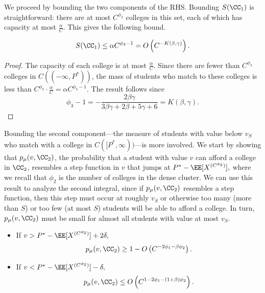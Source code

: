 \documentclass[10pt]{article}
\begin{document}
\begin{ReviewVerbatim}
We proceed by bounding the two components of the RHS. Bounding $S(\CC_1)$ is straightforward: there are at most $C^{\phi_3}$ colleges in this set, each of which has capacity at most $\frac{\alpha}{C}.$ This gives the following bound.
\begin{proposition}\label{prop:duck-1}
\begin{equation}
    S(\CC_1) \le \alpha C^{\phi_3 - 1} = O\left(C^{-K(\beta,\gamma)}\right).
\end{equation}
\end{proposition}
\begin{proof}
    The capacity of each college is at most $\frac{\alpha}{C}$. Since there are fewer than $C^{\phi_3}$ colleges in $C((-\infty, P^*))$, the mass of students who match to these colleges is less than $C^{\phi_3}\cdot \frac{\alpha}{C} = \alpha C^{\phi_3 - 1}.$ The result follows since
    \begin{equation}
        \phi_3 - 1 = -\frac{2\beta\gamma}{3\beta\gamma + 2\beta + 5\gamma + 6} = K(\beta,\gamma).
    \end{equation}
\end{proof}
Bounding the second component---the measure of students with value below $v_S$ who match with a college in $C([P^*,\infty))$---is more involved. We start by showing that $p_\mu(v, \CC_2)$, the probability that a student with value $v$ can afford a college in $\CC_2$, resembles a step function in $v$ that jumps at $P^* - \EE[X^{(C^{\phi_2})}],$ where we recall that $\phi_2$ is the number of colleges in the dense cluster. We can use this result to analyze the second integral, since if $p_\mu(v, \CC_2)$ resembles a step function, then this step must occur at roughly $v_S$ or otherwise too many (more than $S$) or too few (at most $S$) students will be able to afford a college. In turn, $p_\mu(v, \CC_2)$ must be small for almost all students with value at most $v_S$.

\begin{proposition}\label{prop:tomato}
\quad
    \begin{itemize}
        \item[(i)] If $v > P^* - \EE[X^{(C^{\phi_2})}]  + 2\delta,$
        \begin{equation}
            p_\mu(v, \CC_2) \ge 1 - O\left(C^{-2\phi_1 - \beta\phi_2}\right).
        \end{equation}
        \item[(ii)] If $v < P^* - \EE[X^{(C^{\phi_2})}]  - \delta,$
        \begin{equation}
            p_\mu(v, \CC_2) \le O\left(C^{1-2\phi_1 - (1 + \beta)\phi_2}\right).
        \end{equation}
    \end{itemize}
\end{proposition}
\end{ReviewVerbatim}
\end{document}
